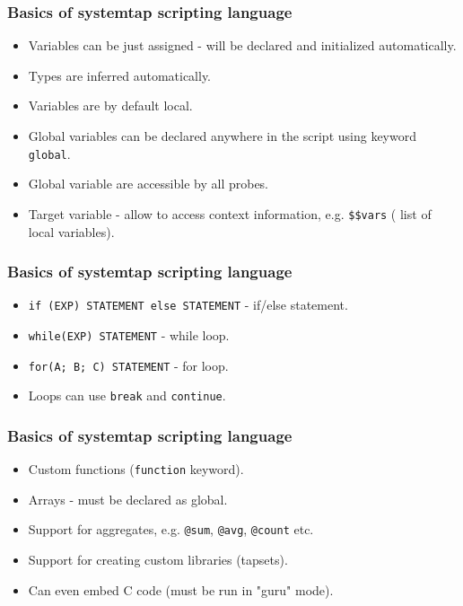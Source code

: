 \documentclass[10pt,utf8]{beamer}
\begin{document}
\begin{frame}
    \frametitle{Basics of systemtap scripting language}
    \begin{itemize}
        \item Variables can be just assigned - will be declared and initialized automatically.
        \item Types are inferred automatically.
        \item Variables are by default local.
        \item Global variables can be declared anywhere in the script using keyword \texttt{global}.
        \item Global variable are accessible by all probes.
        \item Target variable - allow to access context information, e.g. \texttt{\$\$vars} ( list of local variables).
    \end{itemize}

\end{frame}
    
\begin{frame}
    \frametitle{Basics of systemtap scripting language}
    \begin{itemize}
        \item \texttt{if (EXP) STATEMENT else STATEMENT} - if/else statement.
        \item \texttt{while(EXP) STATEMENT} - while loop.
        \item \texttt{for(A; B; C) STATEMENT} - for loop.
        \item Loops can use \texttt{break} and \texttt{continue}.
    \end{itemize}
\end{frame}

\begin{frame}
    \frametitle{Basics of systemtap scripting language}
    \begin{itemize}
        \item Custom functions (\texttt{function} keyword).
        \item Arrays - must be declared as global.
        \item Support for aggregates, e.g. \texttt{@sum}, \texttt{@avg}, \texttt{@count} etc.
        \item Support for creating custom libraries (tapsets).
        \item Can even embed C code (must be run in "guru" mode).
    \end{itemize}
\end{frame}
\end{document}
